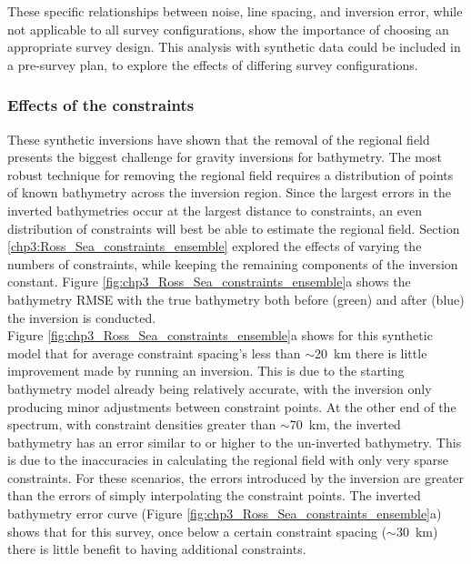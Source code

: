 These specific relationships between noise, line spacing, and inversion error, while not applicable to all survey configurations, show the importance of choosing an appropriate survey design. This analysis with synthetic data could be included in a pre-survey plan, to explore the effects of differing survey configurations. 

\subsubsection{Effects of the constraints} \label{chp3_effect_of_constraints}

These synthetic inversions have shown that the removal of the regional field presents the biggest challenge for gravity inversions for bathymetry. The most robust technique for removing the regional field requires a distribution of points of known bathymetry across the inversion region. Since the largest errors in the inverted bathymetries occur at the largest distance to constraints, an even distribution of constraints will best be able to estimate the regional field. Section \ref{chp3:Ross_Sea_constraints_ensemble} explored the effects of varying the numbers of constraints, while keeping the remaining components of the inversion constant. Figure \ref{fig:chp3_Ross_Sea_constraints_ensemble}a shows the bathymetry RMSE with the true bathymetry both before (green) and after (blue) the inversion is conducted. \\

Figure \ref{fig:chp3_Ross_Sea_constraints_ensemble}a shows for this synthetic model that for average constraint spacing's less than $\sim$20~km there is little improvement made by running an inversion. This is due to the starting bathymetry model already being relatively accurate, with the inversion only producing minor adjustments between constraint points. At the other end of the spectrum, with constraint densities greater than $\sim$70~km, the inverted bathymetry has an error similar to or higher to the un-inverted bathymetry. This is due to the inaccuracies in calculating the regional field with only very sparse constraints. For these scenarios, the errors introduced by the inversion are greater than the errors of simply interpolating the constraint points. The inverted bathymetry error curve (Figure \ref{fig:chp3_Ross_Sea_constraints_ensemble}a) shows that for this survey, once below a certain constraint spacing ($\sim$30~km) there is little benefit to having additional constraints. 


